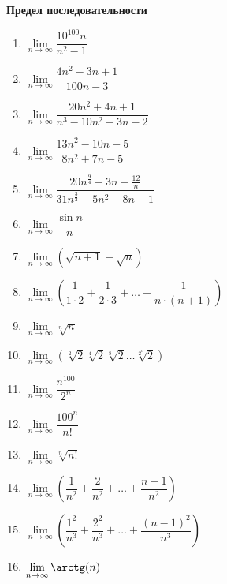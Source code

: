 \documentclass{article}
\begin{document}
\large
	
	
	\begin{center}
		\textbf{Предел последовательности}
	\end{center}
\begin{enumerate}[label*=\protect\fbox{\arabic{enumi}}]
	
\item $\lim\limits_{n \to \infty}{\dfrac{10^{100}n}{n^2 - 1}}$

\item $\lim\limits_{n \to \infty}{\dfrac{4n^2 - 3n + 1}{100n - 3}}$

\item $\lim\limits_{n \to \infty}{\dfrac{20n^2 + 4n + 1}{n^3 - 10 n^2 + 3 n - 2}}$

\item $\lim\limits_{n \to \infty}{\dfrac{13n^2 - 10n - 5}{8n^2 + 7 n - 5}}$

\item $\lim\limits_{n \to \infty}{\dfrac{20n^{\frac{9}{4}}  + 3n - \frac{12}{n}}{31n^{\frac{3}{2}} - 5n^2 - 8n - 1}}$

\item $\lim\limits_{n \to \infty}{\dfrac{\sin{n}}{n}}$

\item $\lim\limits_{n \to \infty}({\sqrt{n + 1} - \sqrt{n}})$

\item $\lim\limits_{n \to \infty}\left({\dfrac{1}{1 \cdot 2} + \dfrac{1}{2 \cdot 3} + \dots + \dfrac{1}{n \cdot (n+1)}}\right)$

\item $\lim\limits_{n \to \infty}{\sqrt[n]{n}} $

\item $\lim\limits_{n \to \infty}\left({\sqrt[2]{2}\sqrt[4]{2}\sqrt[8]{2} \dots \sqrt[2^n]{2}}\right)$

\item $\lim\limits_{n \to \infty}{\dfrac{n^{100}}{2^n}}$
	
\item $\lim\limits_{n \to \infty}{\dfrac{100^n}{n!}}$

\item $\lim\limits_{n \to \infty}{\sqrt[n]{n!}} $

\item $\lim\limits_{n \to \infty}\left({\dfrac{1}{n^2} + \dfrac{2}{n^2} + \dots + \dfrac{n-1}{n^2}}\right)$

\item $\lim\limits_{n \to \infty}\left({\dfrac{1^2}{n^3} + \dfrac{2^2}{n^3} + \dots + \dfrac{(n-1)^2}{n^3}}\right)$

\item $\lim\limits_{n \to \infty}{\arctg(n)}$

\end{enumerate}
\end{document}
